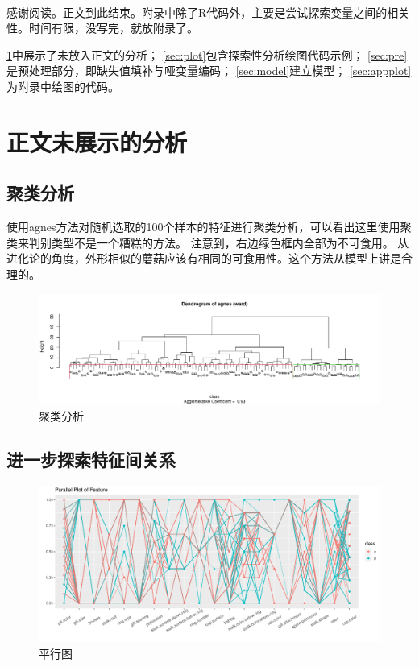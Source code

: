 \documentclass[lang=cn,11pt,a4paper,cite=super]{elegantpaper}
\begin{document}
~\\

感谢阅读。正文到此结束。附录中除了R代码外，主要是尝试探索变量之间的相关性。时间有限，没写完，就放附录了。

\newpage
\nocite{*}


\newpage
\appendix
\appendixpage
\addappheadtotoc
\ref{sec:other}中展示了未放入正文的分析；
\ref{sec:plot}包含探索性分析绘图代码示例；
\ref{sec:pre}是预处理部分，即缺失值填补与哑变量编码；
\ref{sec:model}建立模型；
\ref{sec:appplot}为附录中绘图的代码。
\section{正文未展示的分析}\label{sec:other}
\subsection{聚类分析}
使用agnes方法对随机选取的100个样本的特征进行聚类分析，可以看出这里使用聚类来判别类型不是一个糟糕的方法。
注意到，右边绿色框内全部为不可食用。
从进化论的角度，外形相似的蘑菇应该有相同的可食用性。这个方法从模型上讲是合理的。
\begin{figure}[htb]
   \centering
   \includegraphics[width=\linewidth]{img/clust.pdf}
   \caption{聚类分析}
   \label{fig:jlfx}
 \end{figure}

\subsection{进一步探索特征间关系}
\begin{figure}[htb]
   \centering
   \includegraphics[width=\linewidth]{img/parallel.pdf}
   \caption{平行图}
   \label{fig:pll}
 \end{figure}
\end{document}
